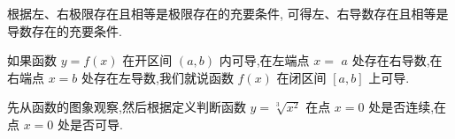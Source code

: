 \documentclass[lang=cn,newtx,10pt,scheme=chinese]{elegantbook}
\begin{document}
根据左、右极限存在且相等是极限存在的充要条件, 可得左、右导数存在且相等是导数存在的充要条件.

\begin{property}
如果函数 \(y = f\left( x\right)\) 在开区间 \(\left( {a,b}\right)\) 内可导,在左端点 \(x =\) \(a\) 处存在右导数,在右端点 \(x = b\) 处存在左导数,我们就说函数 \(f\left( x\right)\) 在闭区间 \(\left\lbrack {a,b}\right\rbrack\) 上可导.
\end{property}

\begin{problemset}[练习]

\item 先从函数的图象观察,然后根据定义判断函数 \(y = \sqrt[3]{{x}^{2}}\) 在点 \(x = 0\) 处是否连续,在点 \(x = 0\) 处是否可导.

\end{problemset}
\end{document}

